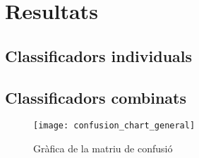 

\section{Resultats}%
\label{sec:resultats}

\subsection{Classificadors individuals}

\subsection{Classificadors combinats}

\begin{figure}[H]
\centering
\texttt{[image: confusion\_chart\_general]}
\caption{Gràfica de la matriu de confusió}%
\label{fig:conf_chart}
\end{figure}